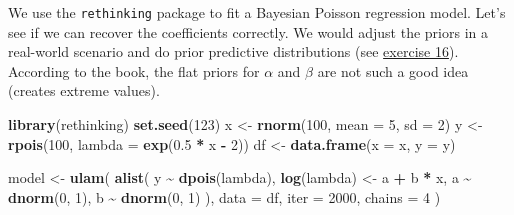\documentclass[
]{article}
\newenvironment{Shaded}{\begin{snugshade}}{\end{snugshade}}
\newcommand{\AttributeTok}[1]{\textcolor[rgb]{0.13,0.29,0.53}{#1}}
\newcommand{\DecValTok}[1]{\textcolor[rgb]{0.00,0.00,0.81}{#1}}
\newcommand{\FloatTok}[1]{\textcolor[rgb]{0.00,0.00,0.81}{#1}}
\newcommand{\FunctionTok}[1]{\textcolor[rgb]{0.13,0.29,0.53}{\textbf{#1}}}
\newcommand{\NormalTok}[1]{#1}
\newcommand{\OtherTok}[1]{\textcolor[rgb]{0.56,0.35,0.01}{#1}}
\newcommand{\SpecialCharTok}[1]{\textcolor[rgb]{0.81,0.36,0.00}{\textbf{#1}}}
\begin{document}
We use the \texttt{rethinking} package to fit a Bayesian Poisson
regression model. Let's see if we can recover the coefficients
correctly. We would adjust the priors in a real-world scenario and do
prior predictive distributions (see \hyperref[exercise16_LMM]{exercise
16}). According to the book, the flat priors for \(\alpha\) and
\(\beta\) are not such a good idea (creates extreme values).

\begin{Shaded}
\begin{Highlighting}[]
\FunctionTok{library}\NormalTok{(rethinking)}
\FunctionTok{set.seed}\NormalTok{(}\DecValTok{123}\NormalTok{)}
\NormalTok{x }\OtherTok{\textless{}{-}} \FunctionTok{rnorm}\NormalTok{(}\DecValTok{100}\NormalTok{, }\AttributeTok{mean =} \DecValTok{5}\NormalTok{, }\AttributeTok{sd =} \DecValTok{2}\NormalTok{)}
\NormalTok{y }\OtherTok{\textless{}{-}} \FunctionTok{rpois}\NormalTok{(}\DecValTok{100}\NormalTok{, }\AttributeTok{lambda =} \FunctionTok{exp}\NormalTok{(}\FloatTok{0.5} \SpecialCharTok{*}\NormalTok{ x }\SpecialCharTok{{-}} \DecValTok{2}\NormalTok{))}
\NormalTok{df }\OtherTok{\textless{}{-}} \FunctionTok{data.frame}\NormalTok{(}\AttributeTok{x =}\NormalTok{ x, }\AttributeTok{y =}\NormalTok{ y)}

\NormalTok{model }\OtherTok{\textless{}{-}} \FunctionTok{ulam}\NormalTok{(}
  \FunctionTok{alist}\NormalTok{(}
\NormalTok{    y }\SpecialCharTok{\textasciitilde{}} \FunctionTok{dpois}\NormalTok{(lambda),}
    \FunctionTok{log}\NormalTok{(lambda) }\OtherTok{\textless{}{-}}\NormalTok{ a }\SpecialCharTok{+}\NormalTok{ b }\SpecialCharTok{*}\NormalTok{ x,}
\NormalTok{    a }\SpecialCharTok{\textasciitilde{}} \FunctionTok{dnorm}\NormalTok{(}\DecValTok{0}\NormalTok{, }\DecValTok{1}\NormalTok{),}
\NormalTok{    b }\SpecialCharTok{\textasciitilde{}} \FunctionTok{dnorm}\NormalTok{(}\DecValTok{0}\NormalTok{, }\DecValTok{1}\NormalTok{)}
\NormalTok{  ),}
  \AttributeTok{data =}\NormalTok{ df,}
  \AttributeTok{iter =} \DecValTok{2000}\NormalTok{,}
  \AttributeTok{chains =} \DecValTok{4}
\NormalTok{)}
\end{Highlighting}
\end{Shaded}
\end{document}
